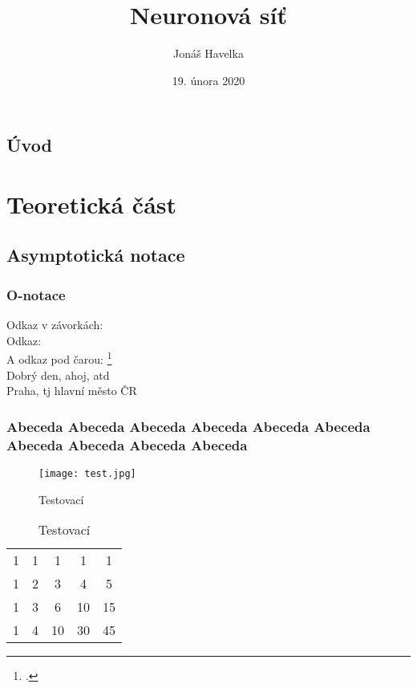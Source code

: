 \documentclass[12pt]{report}			%
\author{Jonáš Havelka}
\title{Neuronová síť}
\date{19. února 2020}
\begin{document}
	\mytitlepage						%
	
	
	\abstrakt{
		\lipsum[1]						%
	}{
		\lipsum[1]						%
	}
	
	\podekovani{
		\lipsum[2]						%
	}
	
	\tableofcontents\newpage			%
	
	
	
	
	\chapter*{Úvod}
	
		\lipsum[1]	
	
	
	\part{Teoretická část}
	
		\chapter{Asymptotická notace}
			
			\section{O-notace}
				Odkaz v závorkách: \parencite[see][page 900]{einstein}\\
				Odkaz: \cite{knuthwebsite}\\
				A odkaz pod čarou: \footcite[see][s. 42]{latexcompanion}\\
				Dobrý den, ahoj, \gls{atd}\\
				Praha, \gls{tj} hlavní město ČR
				
			\section{Abeceda Abeceda Abeceda Abeceda Abeceda Abeceda Abeceda Abeceda Abeceda Abeceda }
				\begin{figure}
				  \texttt{[image: test.jpg]}
				  \caption{Testovací}
				  \label{fig:test}
				\end{figure}
				\begin{table}
				  \caption{Testovací}
				  \label{tab:test2}
				  \begin{tabular}{ccccc}
                  1 & 1 & 1  & 1  & 1  \\
                  1 & 2 & 3  & 4  & 5  \\
                  1 & 3 & 6  & 10 & 15 \\
				  1 & 4 & 10 & 30 & 45
				  \end{tabular}
				\end{table}
\end{document}
